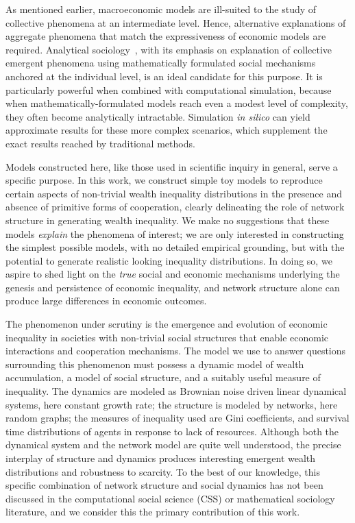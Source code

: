 \documentclass[sigconf]{acmart}
\begin{document}
As mentioned earlier, macroeconomic models are ill-suited to the study of collective phenomena at an intermediate level. Hence, alternative explanations of aggregate phenomena that match the expressiveness of economic models are required. Analytical sociology~\cite{ch1as_hdbk}, with its emphasis on explanation of collective emergent phenomena using mathematically formulated social mechanisms~\cite{ch2as_hdbk,ch11as_hdbk} anchored at the individual level, is an ideal candidate for this purpose. It is particularly powerful when combined with computational simulation, because when mathematically-formulated models reach even a modest level of complexity, they often become analytically intractable. Simulation \textit{in silico} can yield approximate results for these more complex scenarios, which supplement the exact results reached by traditional methods.

Models constructed here, like those used in scientific inquiry in general, serve a specific purpose. In this work, we construct simple toy models to reproduce certain aspects of non-trivial wealth inequality distributions in the presence and absence of primitive forms of cooperation, clearly delineating the role of network structure in generating wealth inequality. We make no suggestions that these models \textit{explain} the phenomena of interest; we are only interested in constructing the simplest possible models, with no detailed empirical grounding, but with the potential to generate realistic looking inequality distributions. In doing so, we aspire to shed light on the \textit{true} social and economic mechanisms underlying the genesis and persistence of economic inequality, and network structure alone can produce large differences in economic outcomes. 


\label{giniKindaSucks}
The phenomenon under scrutiny is the emergence and evolution of economic inequality in societies with non-trivial social structures that enable economic interactions and cooperation mechanisms. The model we use to answer questions surrounding this phenomenon must possess a dynamic model of wealth accumulation, a model of social structure, and a suitably useful measure of inequality. The dynamics are modeled as Brownian noise driven linear dynamical systems, here constant growth rate; the structure is modeled by networks, here random graphs; the measures of inequality used are Gini coefficients, and survival time distributions of agents in response to lack of resources. Although both the dynamical system and the network model are quite well understood, the precise interplay of structure and dynamics produces interesting emergent wealth distributions and robustness to scarcity. To the best of our knowledge, this specific combination of network structure and social dynamics has not been discussed in the computational social science (CSS) or mathematical sociology literature, and we consider this the primary contribution of this work. 
\end{document}
